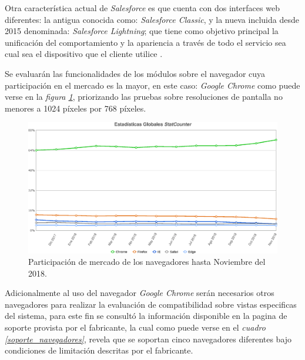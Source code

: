 Otra característica actual de \emph{Salesforce} es que cuenta con dos interfaces
web diferentes: la antigua conocida como: \emph{Salesforce Classic}, y la nueva
incluida desde 2015 denominada: \emph{Salesforce Lightning}; que tiene como
objetivo principal la unificación del comportamiento y la apariencia a través de
todo el servicio sea cual sea el dispositivo que el cliente
utilice \parencite{McCarthy}.

Se evaluarán las funcionalidades de los módulos sobre el navegador cuya
participación en el mercado es la mayor, en este caso: \emph{Google Chrome}
como puede verse en la \emph{figura \ref{software}}, priorizando las pruebas
sobre resoluciones de pantalla no menores a 1024 píxeles por 768 píxeles.

\begin{figure}
\centering
\includegraphics[width=1.0\textwidth]{graphics/compatibilidad.eps}
\caption{Participación de mercado de los navegadores hasta Noviembre del 2018.}
\label{software}
\end{figure}

Adicionalmente al uso del navegador \emph{Google Chrome} serán necesarios
otros navegadores para realizar la evaluación de compatibilidad sobre
vistas especificas del sistema, para este fin se consultó la información
disponible en la pagina de soporte provista por el fabricante, la cual como
puede verse en el \emph{cuadro \ref{soporte_navegadores}}, revela que se
soportan cinco navegadores diferentes bajo condiciones de limitación descritas
por el fabricante.

